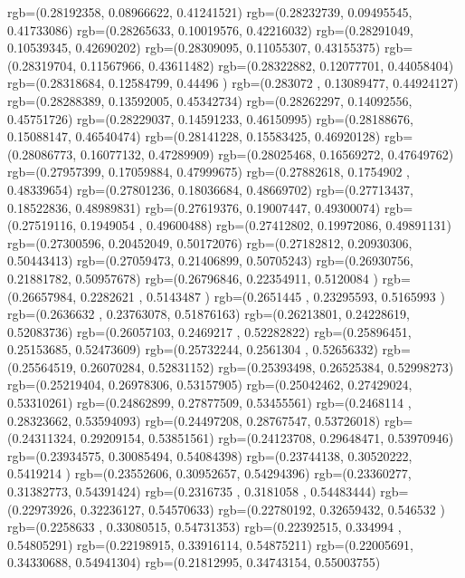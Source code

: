 {{{		  rgb=(0.28192358,  0.08966622,  0.41241521)
		  rgb=(0.28232739,  0.09495545,  0.41733086)
		  rgb=(0.28265633,  0.10019576,  0.42216032)
		  rgb=(0.28291049,  0.10539345,  0.42690202)
		  rgb=(0.28309095,  0.11055307,  0.43155375)
		  rgb=(0.28319704,  0.11567966,  0.43611482)
		  rgb=(0.28322882,  0.12077701,  0.44058404)
		  rgb=(0.28318684,  0.12584799,  0.44496   )
		  rgb=(0.283072  ,  0.13089477,  0.44924127)
		  rgb=(0.28288389,  0.13592005,  0.45342734)
		  rgb=(0.28262297,  0.14092556,  0.45751726)
		  rgb=(0.28229037,  0.14591233,  0.46150995)
		  rgb=(0.28188676,  0.15088147,  0.46540474)
		  rgb=(0.28141228,  0.15583425,  0.46920128)
		  rgb=(0.28086773,  0.16077132,  0.47289909)
		  rgb=(0.28025468,  0.16569272,  0.47649762)
		  rgb=(0.27957399,  0.17059884,  0.47999675)
		  rgb=(0.27882618,  0.1754902 ,  0.48339654)
		  rgb=(0.27801236,  0.18036684,  0.48669702)
		  rgb=(0.27713437,  0.18522836,  0.48989831)
		  rgb=(0.27619376,  0.19007447,  0.49300074)
		  rgb=(0.27519116,  0.1949054 ,  0.49600488)
		  rgb=(0.27412802,  0.19972086,  0.49891131)
		  rgb=(0.27300596,  0.20452049,  0.50172076)
		  rgb=(0.27182812,  0.20930306,  0.50443413)
		  rgb=(0.27059473,  0.21406899,  0.50705243)
		  rgb=(0.26930756,  0.21881782,  0.50957678)
		  rgb=(0.26796846,  0.22354911,  0.5120084 )
		  rgb=(0.26657984,  0.2282621 ,  0.5143487 )
		  rgb=(0.2651445 ,  0.23295593,  0.5165993 )
		  rgb=(0.2636632 ,  0.23763078,  0.51876163)
		  rgb=(0.26213801,  0.24228619,  0.52083736)
		  rgb=(0.26057103,  0.2469217 ,  0.52282822)
		  rgb=(0.25896451,  0.25153685,  0.52473609)
		  rgb=(0.25732244,  0.2561304 ,  0.52656332)
		  rgb=(0.25564519,  0.26070284,  0.52831152)
		  rgb=(0.25393498,  0.26525384,  0.52998273)
		  rgb=(0.25219404,  0.26978306,  0.53157905)
		  rgb=(0.25042462,  0.27429024,  0.53310261)
		  rgb=(0.24862899,  0.27877509,  0.53455561)
		  rgb=(0.2468114 ,  0.28323662,  0.53594093)
		  rgb=(0.24497208,  0.28767547,  0.53726018)
		  rgb=(0.24311324,  0.29209154,  0.53851561)
		  rgb=(0.24123708,  0.29648471,  0.53970946)
		  rgb=(0.23934575,  0.30085494,  0.54084398)
		  rgb=(0.23744138,  0.30520222,  0.5419214 )
		  rgb=(0.23552606,  0.30952657,  0.54294396)
		  rgb=(0.23360277,  0.31382773,  0.54391424)
		  rgb=(0.2316735 ,  0.3181058 ,  0.54483444)
		  rgb=(0.22973926,  0.32236127,  0.54570633)
		  rgb=(0.22780192,  0.32659432,  0.546532  )
		  rgb=(0.2258633 ,  0.33080515,  0.54731353)
		  rgb=(0.22392515,  0.334994  ,  0.54805291)
		  rgb=(0.22198915,  0.33916114,  0.54875211)
		  rgb=(0.22005691,  0.34330688,  0.54941304)
		  rgb=(0.21812995,  0.34743154,  0.55003755)
}}}
